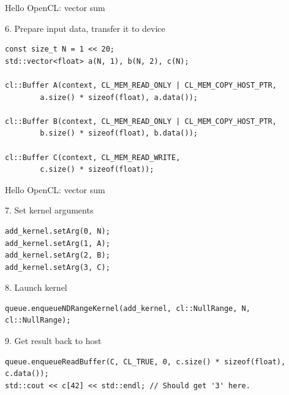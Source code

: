 \documentclass[@BEAMER_OPTIONS@]{beamer}
\begin{document}
\begin{frame}[fragile]{Hello OpenCL: vector sum}
    \begin{exampleblock}{6. Prepare input data, transfer it to device}
        \begin{lstlisting}[firstnumber=last]
const size_t N = 1 << 20;
std::vector<float> a(N, 1), b(N, 2), c(N);

cl::Buffer A(context, CL_MEM_READ_ONLY | CL_MEM_COPY_HOST_PTR,
        a.size() * sizeof(float), a.data());

cl::Buffer B(context, CL_MEM_READ_ONLY | CL_MEM_COPY_HOST_PTR,
        b.size() * sizeof(float), b.data());

cl::Buffer C(context, CL_MEM_READ_WRITE,
        c.size() * sizeof(float));
        \end{lstlisting}
    \end{exampleblock}
\end{frame}


\begin{frame}[fragile]{Hello OpenCL: vector sum}
    \begin{exampleblock}{7. Set kernel arguments}
        \begin{lstlisting}[firstnumber=last]
add_kernel.setArg(0, N);
add_kernel.setArg(1, A);
add_kernel.setArg(2, B);
add_kernel.setArg(3, C);
        \end{lstlisting}
    \end{exampleblock}
    \begin{exampleblock}{8. Launch kernel}
        \begin{lstlisting}[firstnumber=last]
queue.enqueueNDRangeKernel(add_kernel, cl::NullRange, N, cl::NullRange);
        \end{lstlisting}
    \end{exampleblock}
    \begin{exampleblock}{9. Get result back to host}
        \begin{lstlisting}[firstnumber=last]
queue.enqueueReadBuffer(C, CL_TRUE, 0, c.size() * sizeof(float), c.data());
std::cout << c[42] << std::endl; // Should get '3' here.
        \end{lstlisting}
    \end{exampleblock}
\end{frame}
\end{document}
